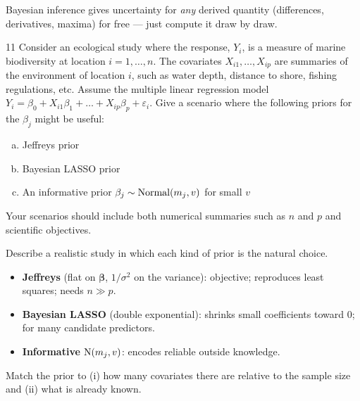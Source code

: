 \documentclass[11pt]{article}
\begin{document}
\begin{takeaway}
Bayesian inference gives uncertainty for \emph{any} derived quantity (differences, derivatives, maxima) for free --- just compute it draw by draw.
\end{takeaway}


\begin{problem}{11}
Consider an ecological study where the response, $Y_i$, is a measure of marine biodiversity at location $i=1,\dots,n$. The covariates $X_{i1},\dots,X_{ip}$ are summaries of the environment of location $i$, such as water depth, distance to shore, fishing regulations, etc. Assume the multiple linear regression model $Y_i=\beta_0+X_{i1}\beta_1+\dots+X_{ip}\beta_p+\varepsilon_i$. Give a scenario where the following priors for the $\beta_j$ might be useful:
\begin{enumerate}[(a)]
\item Jeffreys prior
\item Bayesian LASSO prior
\item An informative prior $\beta_j\sim\mathrm{Normal}(m_j,v)$ for small $v$
\end{enumerate}
Your scenarios should include both numerical summaries such as $n$ and $p$ and scientific objectives.
\end{problem}

\begin{restate}
Describe a realistic study in which each kind of prior is the natural choice.
\end{restate}

\begin{recall}
\begin{itemize}
\item \textbf{Jeffreys} (flat on $\bm\beta$, $1/\sigma^2$ on the variance): objective; reproduces least squares; needs $n\gg p$.
\item \textbf{Bayesian LASSO} (double exponential): shrinks small coefficients toward 0; for many candidate predictors.
\item \textbf{Informative} $\mathrm{N}(m_j,v)$: encodes reliable outside knowledge.
\end{itemize}
\end{recall}

\begin{keyidea}
Match the prior to (i) how many covariates there are relative to the sample size and (ii) what is already known.
\end{keyidea}
\end{document}
